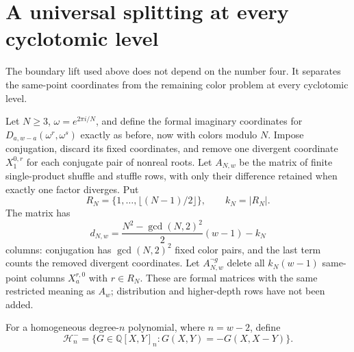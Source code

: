 \section{A universal splitting at every cyclotomic level}
\label{fg:sec:universal}

The boundary lift used above does not depend on the number four. It
separates the same-point coordinates from the remaining color problem
at every cyclotomic level.

Let $N\ge3$, $\omega=e^{2\pi i/N}$, and define the formal imaginary
coordinates for $D_{a,w-a}(\omega^r,\omega^s)$ exactly as before, now
with colors modulo $N$. Impose conjugation, discard its fixed
coordinates, and remove one divergent coordinate $X_1^{0,r}$ for
each conjugate pair of nonreal roots. Let $A_{N,w}$ be the matrix of
finite single-product shuffle and stuffle rows, with only their
difference retained when exactly one factor diverges. Put
\[
 R_N=\{1,\ldots,\lfloor(N-1)/2\rfloor\},\qquad k_N=|R_N|.
\]
The matrix has
\[
 d_{N,w}=\frac{N^2-\gcd(N,2)^2}{2}(w-1)-k_N
\]
columns: conjugation has $\gcd(N,2)^2$ fixed color pairs, and the
last term counts the removed divergent coordinates. Let
$A_{N,w}^{\neg g}$ delete all $k_N(w-1)$ same-point columns
$X_a^{r,0}$ with $r\in R_N$. These are formal matrices with the same
restricted meaning as $A_w$; distribution and higher-depth rows
have not been added.

For a homogeneous degree-$n$ polynomial, where $n=w-2$, define
\[
 \mathcal H_n^-=
 \{G\in\mathbb Q[X,Y]_n:G(X,Y)=-G(X,X-Y)\}.
\]

